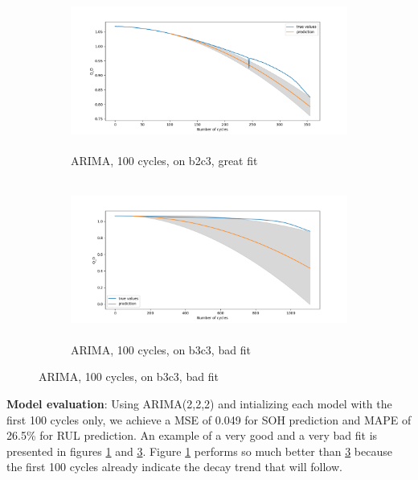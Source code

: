 \documentclass{article}
\begin{document}
\begin{figure}[H]
\centering
    \begin{subfigure}{.5\textwidth}
  \centering
  \includegraphics[height=5.2cm,width=1\linewidth]{figs/best fit 100.png}
  \caption{ARIMA, 100 cycles, on b2c3, great fit}
  \label{fig:sub1}
\end{subfigure}%
\begin{subfigure}{.5\textwidth}
  \centering
  \includegraphics[height=5.2cm,width=1\linewidth]{figs/worst fit 100.png}
  \caption{ARIMA, 100 cycles, on b3c3, bad fit}
  \label{fig:sub2}
\end{subfigure}
\end{figure}

\textbf{Model evaluation}: Using ARIMA(2,2,2) and intializing each model with the first 100 cycles only, we achieve a MSE of 0.049 for SOH prediction and MAPE of 26.5\% for RUL prediction. An example of a very good and a very bad fit is presented in figures \ref{fig:sub1} and \ref{fig:sub2}. Figure \ref{fig:sub1} performs so much better than \ref{fig:sub2} because the first 100 cycles already indicate the decay trend that will follow. 


\end{document}
